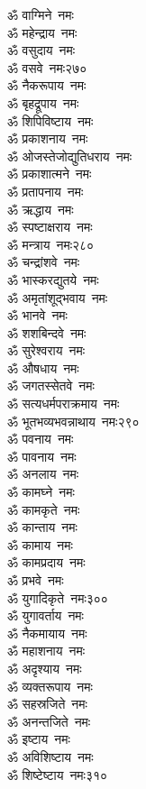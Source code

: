 \begin{multicols}{2}
\begin{flushleft}
ॐ वाग्मिने~नमः\\
ॐ महेन्द्राय~नमः\\
ॐ वसुदाय~नमः\\
ॐ वसवे~नमः\hfill २७०\\
ॐ नैकरूपाय~नमः\\
ॐ बृहद्रूपाय~नमः\\
ॐ शिपिविष्टाय~नमः\\
ॐ प्रकाशनाय~नमः\\
ॐ ओजस्तेजोद्युतिधराय~नमः\\
ॐ प्रकाशात्मने~नमः\\
ॐ प्रतापनाय~नमः\\
ॐ ऋद्धाय~नमः\\
ॐ स्पष्टाक्षराय~नमः\\
ॐ मन्त्राय~नमः\hfill २८०\\
ॐ चन्द्रांशवे~नमः\\
ॐ भास्करद्युतये~नमः\\
ॐ अमृतांशूद्भवाय~नमः\\
ॐ भानवे~नमः\\
ॐ शशबिन्दवे~नमः\\
ॐ सुरेश्वराय~नमः\\
ॐ औषधाय~नमः\\
ॐ जगतस्सेतवे~नमः\\
ॐ सत्यधर्मपराक्रमाय~नमः\\
ॐ भूतभव्यभवन्नाथाय~नमः\hfill २९०\\
ॐ पवनाय~नमः\\
ॐ पावनाय~नमः\\
ॐ अनलाय~नमः\\
ॐ कामघ्ने~नमः\\
ॐ कामकृते~नमः\\
ॐ कान्ताय~नमः\\
ॐ कामाय~नमः\\
ॐ कामप्रदाय~नमः\\
ॐ प्रभवे~नमः\\
ॐ युगादिकृते~नमः\hfill ३००\\
ॐ युगावर्ताय~नमः\\
ॐ नैकमायाय~नमः\\
ॐ महाशनाय~नमः\\
ॐ अदृश्याय~नमः\\
ॐ व्यक्तरूपाय~नमः\\
ॐ सहस्रजिते~नमः\\
ॐ अनन्तजिते~नमः\\
ॐ इष्टाय~नमः\\
ॐ अविशिष्टाय~नमः\\
ॐ शिष्टेष्टाय~नमः\hfill ३१०\\

\end{flushleft}
\end{multicols}
